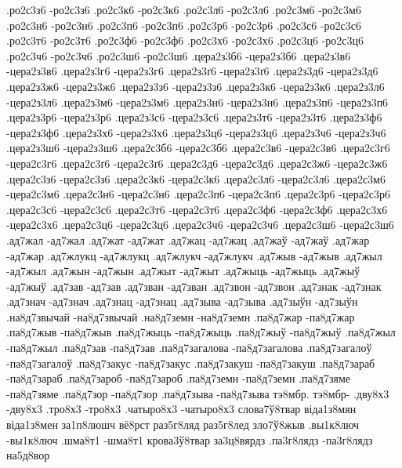 {.ро2с3з6 -ро2с3з6
.ро2с3к6 -ро2с3к6
.ро2с3л6 -ро2с3л6
.ро2с3м6 -ро2с3м6
.ро2с3н6 -ро2с3н6
.ро2с3п6 -ро2с3п6
.ро2с3р6 -ро2с3р6
.ро2с3с6 -ро2с3с6
.ро2с3т6 -ро2с3т6
.ро2с3ф6 -ро2с3ф6
.ро2с3х6 -ро2с3х6
.ро2с3ц6 -ро2с3ц6
.ро2с3ч6 -ро2с3ч6
.ро2с3ш6 -ро2с3ш6
.цера2з3б6 -цера2з3б6
.цера2з3в6 -цера2з3в6
.цера2з3г6 -цера2з3г6
.цера2з3ґ6 -цера2з3ґ6
.цера2з3д6 -цера2з3д6
.цера2з3ж6 -цера2з3ж6
.цера2з3з6 -цера2з3з6
.цера2з3к6 -цера2з3к6
.цера2з3л6 -цера2з3л6
.цера2з3м6 -цера2з3м6
.цера2з3н6 -цера2з3н6
.цера2з3п6 -цера2з3п6
.цера2з3р6 -цера2з3р6
.цера2з3с6 -цера2з3с6
.цера2з3т6 -цера2з3т6
.цера2з3ф6 -цера2з3ф6
.цера2з3х6 -цера2з3х6
.цера2з3ц6 -цера2з3ц6
.цера2з3ч6 -цера2з3ч6
.цера2з3ш6 -цера2з3ш6
.цера2с3б6 -цера2с3б6
.цера2с3в6 -цера2с3в6
.цера2с3г6 -цера2с3г6
.цера2с3ґ6 -цера2с3ґ6
.цера2с3д6 -цера2с3д6
.цера2с3ж6 -цера2с3ж6
.цера2с3з6 -цера2с3з6
.цера2с3к6 -цера2с3к6
.цера2с3л6 -цера2с3л6
.цера2с3м6 -цера2с3м6
.цера2с3н6 -цера2с3н6
.цера2с3п6 -цера2с3п6
.цера2с3р6 -цера2с3р6
.цера2с3с6 -цера2с3с6
.цера2с3т6 -цера2с3т6
.цера2с3ф6 -цера2с3ф6
.цера2с3х6 -цера2с3х6
.цера2с3ц6 -цера2с3ц6
.цера2с3ч6 -цера2с3ч6
.цера2с3ш6 -цера2с3ш6
%
%
%
.ад7жал -ад7жал
.ад7жат -ад7жат
.ад7жац -ад7жац
.ад7жаў -ад7жаў
.ад7жар -ад7жар
.ад7жлукц -ад7жлукц
.ад7жлукч -ад7жлукч
.ад7жыв -ад7жыв
.ад7жыл -ад7жыл
.ад7жын -ад7жын
.ад7жыт -ад7жыт
.ад7жыць -ад7жыць
.ад7жыў -ад7жыў
.ад7зав -ад7зав
.ад7зван -ад7зван
.ад7звон -ад7звон
.ад7знак -ад7знак
.ад7знач -ад7знач
.ад7знац -ад7знац
.ад7зыва -ад7зыва
.ад7зыўн -ад7зыўн
.на8д7звычай -на8д7звычай
.на8д7земн -на8д7земн
.па8д7жар -па8д7жар
.па8д7жыв -па8д7жыв
.па8д7жыць -па8д7жыць
.па8д7жыў -па8д7жыў
.па8д7жыл -па8д7жыл
.па8д7зав -па8д7зав
.па8д7загалова -па8д7загалова
.па8д7загалоў -па8д7загалоў
.па8д7закус -па8д7закус
.па8д7закуш -па8д7закуш
.па8д7зараб -па8д7зараб
.па8д7зароб -па8д7зароб
.па8д7земн -па8д7земн
.па8д7зяме -па8д7зяме
.па8д7зор -па8д7зор
.па8д7зыва -па8д7зыва
%
%
%
тэ8мбр. тэ8мбр-
.дву8х3 -дву8х3
.тро8х3 -тро8х3
.чатыро8х3 -чатыро8х3
слова7ў8твар
віда1з8мян
віда1з8мен
за1п8люшч
вё8рст
раз5г8ляд
раз5г8лед
зло7ў8жыв
.вы1к8люч -вы1к8люч
.шма8т1 -шма8т1
крова3ў8твар
за3ц8вярдз
.па3г8лядз -па3г8лядз
на5д8вор
}

